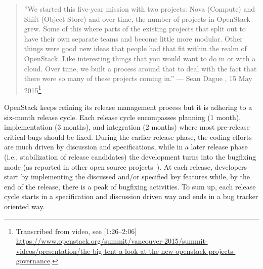 \begin{quotation}
\footnotesize
''We started this five-year mission with two projects: Nova (Compute) and Shift (Object Store) and over time, the number of projects in OpenStack grew. Some of this where parts of the existing projects that split out to have their own separate teams and become little more modular. Other things were good new ideas that people had that fit within the realm of OpenStack. Like interesting things that you would want to do in or with a cloud. Over time, we built a process around that to deal with the fact that there were so many of these projects coming in.'' --- Sean Dague , 15 May 2015\footnote{Transcribed from video, see [1:26--2:06] \url{https://www.openstack.org/summit/vancouver-2015/summit-videos/presentation/the-big-tent-a-look-at-the-new-openstack-projects-governance}.}
\end{quotation}

OpenStack keeps refining its release management process but it is adhering to a six-month release cycle. Each release cycle encompasses planning (1 month), implementation (3 months), and integration (2 months) where most pre-release critical bugs should be fixed. During the earlier release phase, the coding efforts are much driven by discussion and specifications, while in a later release phase (i.e., stabilization of release candidates) the development turns into the bugfixing mode (as reported in other open source projects~\cite{martinez2008using,rossi2009analysis,michlmayr2015and}). At each release, developers start by implementing the discussed and/or specified key features while, by the end of the release, there is a peak of bugfixing activities. To sum up, each release cycle starts in a specification and discussion driven way and ends in a bug tracker oriented way.    



